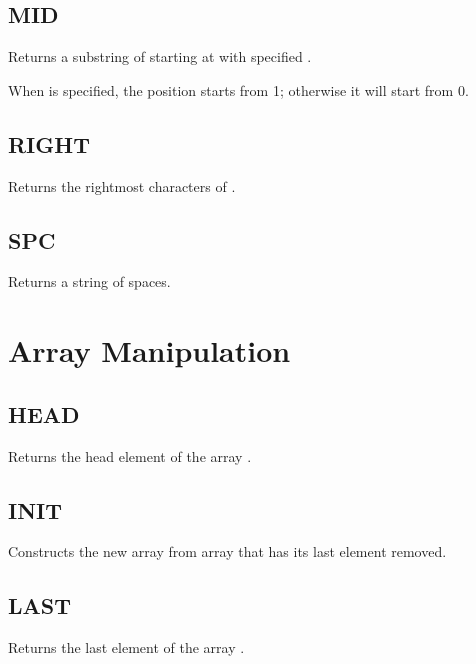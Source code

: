     \subsection{MID}
        \par
        Returns a substring of  starting at  with specified .\par
        When  is specified, the position starts from 1; otherwise it will start from 0. 
    \subsection{RIGHT}
        \par
        Returns the rightmost  characters of .
    \subsection{SPC}
        \par
        Returns a string of  spaces.

\section{Array Manipulation}
        
    \subsection{HEAD}
        \par
        Returns the head element of the array .
    \subsection{INIT}
        \par
        Constructs the new array from array  that has its last element removed.
    \subsection{LAST}
        \par
        Returns the last element of the array .
